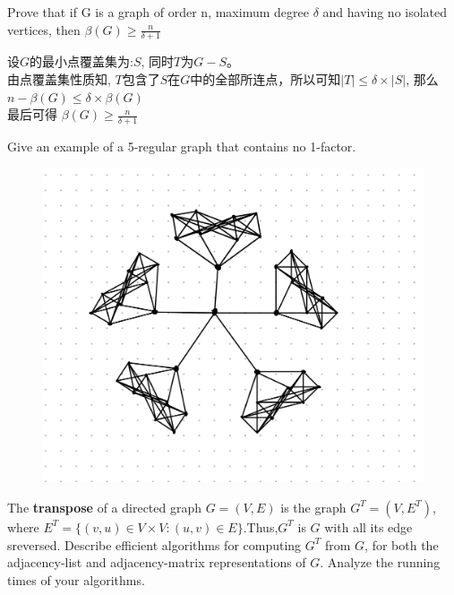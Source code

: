 \documentclass[a4paper, justified]{tufte-handout}
\begin{document}

\begin{problem}[3-12.4 CZ 8.16]
Prove that if G is a graph of order n, maximum degree $\delta$ and having no isolated vertices, then $\beta(G)\geq \frac{n}{\delta + 1}$
\end{problem}

\begin{solution}
    设$G$的最小点覆盖集为:$S$, 同时$T$为$G-S$。\\
    由点覆盖集性质知, $T$包含了$S$在$G$中的全部所连点，所以可知$|T|\leq \delta \times |S|$, 那么$n-\beta(G)\leq \delta \times \beta(G)$\\
    最后可得 $\beta(G)\geq \frac{n}{\delta + 1}$
\end{solution}

\begin{problem}[3-12.5 CZ 8.18]
Give an example of a 5-regular graph that contains no 1-factor.
\end{problem}

\begin{solution}
    \newpage
    \begin{figure}[htbp]
        \centering
        \includegraphics[width = 0.75\linewidth]{5.jpg}
    \end{figure}
\end{solution}


\begin{problem}[3-7.1 TC 22.1-3]
The \textbf{transpose} of a directed graph $G=(V,E)$ is the graph $G^T=(V,E^T)$, where $E^T=\{(v,u)\in V\times V:(u,v) \in E\}$.Thus,$G^T$ is $G$ with all its edge sreversed. Describe efficient algorithms for computing $G^T$ from $G$, for both the adjacency-list and adjacency-matrix representations of $G$. Analyze the running times of your algorithms.
\end{problem}
\end{document}

